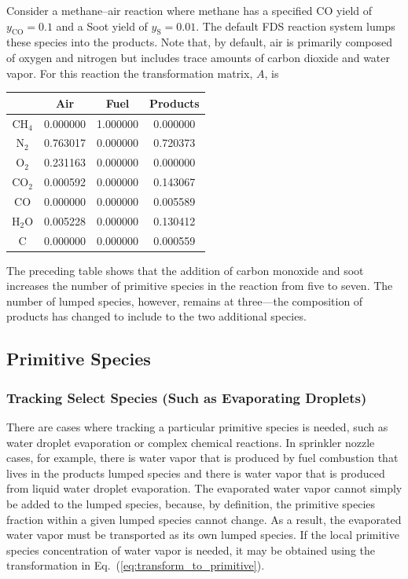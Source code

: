 Consider a methane--air reaction where methane has a specified CO yield of $y_{\mathrm{CO}}=0.1$ and a Soot yield of $y_{\mathrm{S}}=0.01$. The default FDS reaction system lumps these species into the products. Note that, by default, air is primarily composed of oxygen and nitrogen but includes trace amounts of carbon dioxide and water vapor. For this reaction the transformation matrix, $A$, is

\begin{center}
\begin{tabular}{|c|c|c|c|}
\hline  & Air & Fuel & Products \\ \hline \hline
{CH$_4$}           & 0.000000 & 1.000000 & 0.000000 \\
{N$_2$}            & 0.763017 & 0.000000 & 0.720373 \\
{O$_2$}            & 0.231163 & 0.000000 & 0.000000 \\
{CO$_2$}           & 0.000592 & 0.000000 & 0.143067 \\
{CO}               & 0.000000 & 0.000000 & 0.005589 \\ 
{H$_2$O}           & 0.005228 & 0.000000 & 0.130412 \\
{C}                & 0.000000 & 0.000000 & 0.000559 \\ \hline
\end{tabular}
\end{center}

\noindent The preceding table shows that the addition of carbon monoxide and soot increases the number of primitive species in the reaction from five to seven. The number of lumped species, however, remains at three---the composition of products has changed to include to the two additional species.


\subsection{Primitive Species}

\subsubsection{Tracking Select Species (Such as Evaporating Droplets)}

There are cases where tracking a particular primitive species is needed, such as water droplet evaporation or complex chemical reactions. In sprinkler nozzle cases, for example, there is water vapor that is produced by fuel combustion that lives in the products lumped species and there is water vapor that is produced from liquid water droplet evaporation. The evaporated water vapor cannot simply be added to the lumped species, because, by definition, the primitive species fraction within a given lumped species cannot change. As a result, the evaporated water vapor must be transported as its own lumped species.  If the local primitive species concentration of water vapor is needed, it may be obtained using the transformation in Eq.~(\ref{eq:transform_to_primitive}).   

